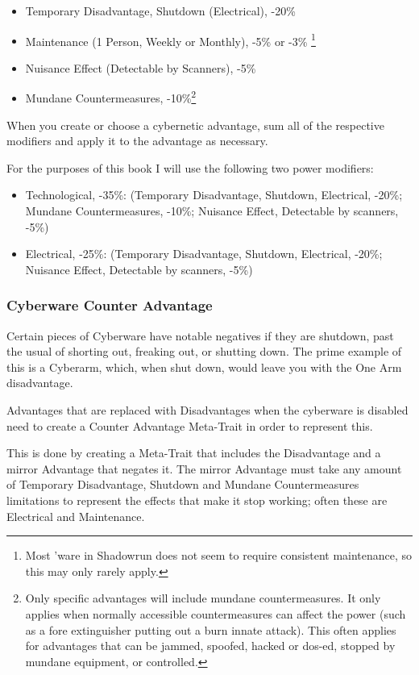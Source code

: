 \begin{multicols*}{3}
	\begin{itemize}
		\item Temporary Disadvantage, Shutdown (Electrical), -20\%
		\item Maintenance (1 Person, Weekly or Monthly), -5\% or -3\% \footnote{Most 'ware in Shadowrun does not seem to require consistent maintenance, so this may only rarely apply.}
		\item Nuisance Effect (Detectable by Scanners), -5\%
		\item Mundane Countermeasures, -10\%\footnote{Only specific advantages will include mundane countermeasures. It only applies when normally accessible countermeasures can affect the power (such as a fore extinguisher putting out a burn innate attack). This often applies for advantages that can be jammed, spoofed, hacked or dos-ed, stopped by mundane equipment, or controlled.}
	\end{itemize}
	
	When you create or choose a cybernetic advantage, sum all of the respective modifiers and apply it to the advantage as necessary.
	
	For the purposes of this book I will use the following two power modifiers:
	
	\begin{itemize}
		\item Technological, -35\%: (Temporary Disadvantage, Shutdown, Electrical,  -20\%; Mundane Countermeasures, -10\%; Nuisance Effect, Detectable by scanners, -5\%)
		\item Electrical, -25\%: (Temporary Disadvantage, Shutdown, Electrical, -20\%; Nuisance Effect, Detectable by scanners, -5\%)
	\end{itemize}
	
	\subsubsection{Cyberware Counter Advantage}
	
	Certain pieces of Cyberware have notable negatives if they are shutdown, past the usual of shorting out, freaking out, or shutting down. The prime example of this is a Cyberarm, which, when shut down, would leave you with the One Arm disadvantage. 
	
	Advantages that are replaced with Disadvantages when the cyberware is disabled need to create a Counter Advantage Meta-Trait in order to represent this.
	
	This is done by creating a Meta-Trait that includes the Disadvantage and a mirror Advantage that negates it. The mirror Advantage must take any amount of Temporary Disadvantage, Shutdown and Mundane Countermeasures limitations to represent the effects that make it stop working; often these are Electrical and Maintenance.
	

\end{multicols*}
